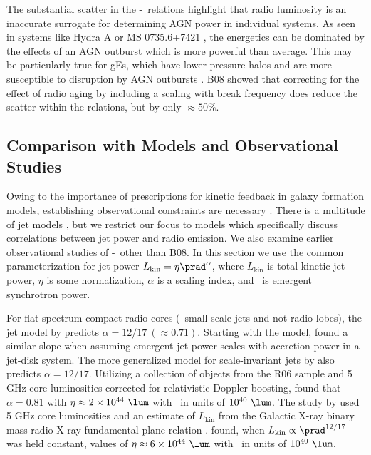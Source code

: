 \documentclass{emulateapj}
\begin{document}
The substantial scatter in the \pjet-\prad\ relations highlight that
radio luminosity is an inaccurate surrogate for determining AGN power
in individual systems. As seen in systems like Hydra A \citep{hydraa}
or MS 0735.6+7421 \citep{ms0735}, the energetics can be dominated by
the effects of an AGN outburst which is more powerful than
average. This may be particularly true for gEs, which have lower
pressure halos and are more susceptible to disruption by AGN outbursts
\citep{2006MNRAS.372.1161W, 2008ApJ...687L..53P}. B08 showed
that correcting for the effect of radio aging by including a scaling
with break frequency does reduce the scatter within the relations, but
by only $\approx 50\%$.

\subsection{Comparison with Models and Observational Studies}
\label{sec:models}

Owing to the importance of prescriptions for kinetic feedback in
galaxy formation models, establishing observational constraints are
necessary \citep[\eg][]{2007ApJ...658L...9H}. There is a multitude of
jet models \citep[\ie][]{1973MNRAS.164..243L, 1974MNRAS.166..513S,
1974MNRAS.169..395B, 1989ApJ...345L..21B, 2002ApJS..141..337C,
2002ApJS..141..371C}, but we restrict our focus to models which
specifically discuss correlations between jet power and radio
emission. We also examine earlier observational studies of
\pjet-\prad\ other than B08. In this section we use the common
parameterization for jet power $L_{\mathrm{kin}} = \eta
\prad^{\alpha}$, where $L_{\mathrm{kin}}$ is total kinetic jet power,
$\eta$ is some normalization, $\alpha$ is a scaling index, and \prad\
is emergent synchrotron power.

For flat-spectrum compact radio cores (\eg\ small scale jets and not
radio lobes), the jet model by \citet{1979ApJ...232...34B} predicts
$\alpha = 12/17~(\approx 0.71)$. Starting with the
\citet{1979ApJ...232...34B} model, \citet{1995A&A...293..665F} found a
similar slope when assuming emergent jet power scales with accretion
power in a jet-disk system. The more generalized model for
scale-invariant jets by \citet{2003MNRAS.343L..59H} also predicts
$\alpha = 12/17$. Utilizing a collection of objects from the R06
sample and 5 GHz core luminosities corrected for relativistic Doppler
boosting, \citet{2007MNRAS.381..589M} found that $\alpha = 0.81$ with
$\eta \approx 2\times10^{44} ~\lum$ with \prad\ in units of $10^{40}
~\lum$. The study by \citet{2005ApJ...633..384H} used 5 GHz core
luminosities and an estimate of $L_{\mathrm{kin}}$ from the Galactic
X-ray binary mass-radio-X-ray fundamental plane relation
\citep{2003MNRAS.344...60G,
2003MNRAS.345.1057M}. \citet{2005ApJ...633..384H} found, when
$L_{\mathrm{kin}} \propto \prad^{12/17}$ was held constant, values of
$\eta \approx 6\times10^{44} ~\lum$ with \prad\ in units of $10^{40}
~\lum$.
\end{document}
